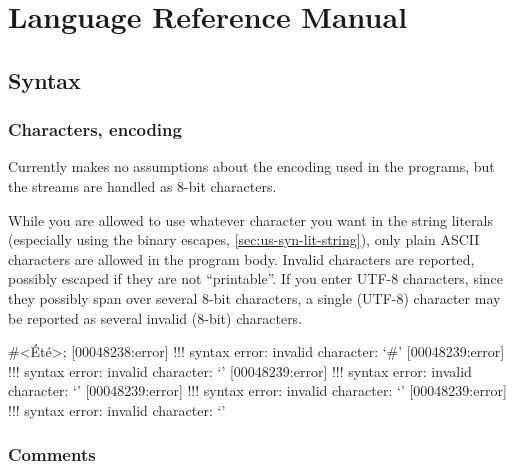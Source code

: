 
\chapter{\us Language Reference Manual}
\label{sec:lang}

\section{Syntax}

\subsection{Characters, encoding}

Currently \us makes no assumptions about the encoding used in the
programs, but the streams are handled as 8-bit characters.

While you are allowed to use whatever character you want in the string
literals (especially using the binary escapes,
\autoref{sec:us-syn-lit-string}), only plain ASCII characters are
allowed in the program body.  Invalid characters are reported,
possibly escaped if they are not ``printable''.  If you enter UTF-8
characters, since they possibly span over several 8-bit characters, a
single (UTF-8) character may be reported as several invalid (8-bit)
characters.

\begin{urbiscript}[firstnumber=1,escapeinside=<>]
#<Été>;
[00048238:error] !!! syntax error: invalid character: `#'
[00048239:error] !!! syntax error: invalid character: `'
[00048239:error] !!! syntax error: invalid character: `'
[00048239:error] !!! syntax error: invalid character: `'
[00048239:error] !!! syntax error: invalid character: `'
\end{urbiscript}

\subsection{Comments}

